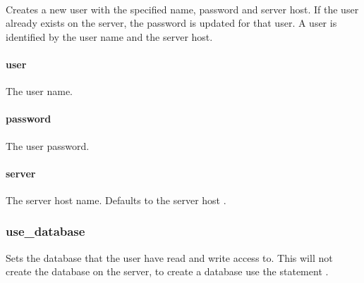 \\

Creates a new user with the specified name, password and server host.
If the user already exists on the server, the password is updated for that user.
A user is identified by the user name and the server host.

\paragraph{user}

The user name.

\paragraph{password}

The user password.

\paragraph{server}

The server host name. Defaults to the server host .

\subsubsection{use\_database}


Sets the database that the user have read and write access to. This will not create
the database on the server, to create a database use the statement .

